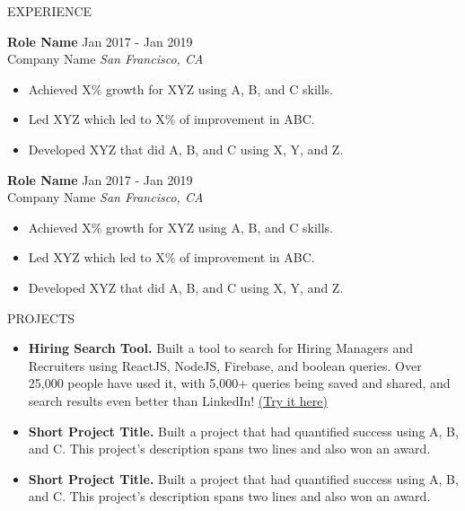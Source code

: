 \documentclass{resume} %
\begin{document}
\begin{rSection}{EXPERIENCE}

\textbf{Role Name} \hfill Jan 2017 - Jan 2019\\
Company Name \hfill \textit{San Francisco, CA}
\begin{itemize}[leftmargin=*]
    \item Achieved X\% growth for XYZ using A, B, and C skills.
    \item Led XYZ which led to X\% of improvement in ABC.
    \item Developed XYZ that did A, B, and C using X, Y, and Z.
\end{itemize}

\textbf{Role Name} \hfill Jan 2017 - Jan 2019\\
Company Name \hfill \textit{San Francisco, CA}
\begin{itemize}[leftmargin=*]
    \item Achieved X\% growth for XYZ using A, B, and C skills.
    \item Led XYZ which led to X\% of improvement in ABC.
    \item Developed XYZ that did A, B, and C using X, Y, and Z.
\end{itemize}

\end{rSection} 


\begin{rSection}{PROJECTS}
\vspace{-1.25em}
\begin{itemize}[leftmargin=*]
    \item \textbf{Hiring Search Tool.} {Built a tool to search for Hiring Managers and Recruiters using ReactJS, NodeJS, Firebase, and boolean queries. Over 25,000 people have used it, with 5,000+ queries being saved and shared, and search results even better than LinkedIn! \href{https://hiring-search.careerflow.ai/}{(Try it here)}}
    \item \textbf{Short Project Title.} {Built a project that had quantified success using A, B, and C. This project's description spans two lines and also won an award.}
    \item \textbf{Short Project Title.} {Built a project that had quantified success using A, B, and C. This project's description spans two lines and also won an award.}
\end{itemize}
\end{rSection} 
\end{document}
